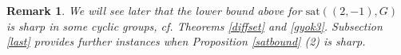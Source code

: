\documentclass[11pt]{article}
\numberwithin{table}{section}
\newcommand{\Z}{{\mathbb Z}}
\newcommand{\sat}{\mathrm{sat}}
\newtheorem{remark}[theorem]{Remark}
\newtheorem{prop}[theorem]{\bf Proposition}
\theoremstyle{definition}
\begin{document}
	
	
	
	
	
	
	
	\begin{remark}
		We will see later that the lower bound above for $\sat((2,-1),G)$ is sharp in some cyclic groups, cf. Theorems \ref{diffset} and \ref{gyok3}. Subsection \ref{last} provides further instances when Proposition \ref{satbound}  (2) is sharp. 
	\end{remark}
	
\end{document}
